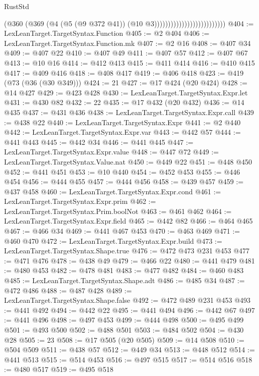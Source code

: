 \begin{lexlean}{RustStd}
\begin{coremodule}
{\begin{coremodule}
{{{{{{{{{{{{{{{{{{{{{{{{{{                                                (@360
                                                  (@369
                                                    (@4
                                                      (@5 (@9 @372 @41))
                                                      (@10 @3))))))))))))))))))))))))))
@404 := LexLeanTarget.TargetSyntax.Function
@405 := @2 @404
@406 := LexLeanTarget.TargetSyntax.Function.mk
@407 := @2 @16
@408 := @407 @34
@409 := @407 @22
@410 := @407 @49
@411 := @407 @57
@412 := @407 @67
@413 := @10 @16
@414 := @412 @413
@415 := @411 @414
@416 := @410 @415
@417 := @409 @416
@418 := @408 @417
@419 := @406 @418
@423 := @419 (@73 (@36 (@30 @349)))
@424 := 21
@427 := @17 @424 (@20 @424)
@428 := @14 @427
@429 := @423 @428
@430 := LexLeanTarget.TargetSyntax.Expr.let
@431 := @430 @82
@432 := 22
@435 := @17 @432 (@20 @432)
@436 := @14 @435
@437 := @431 @436
@438 := LexLeanTarget.TargetSyntax.Expr.call
@439 := @438 @22
@440 := LexLeanTarget.TargetSyntax.Expr
@441 := @2 @440
@442 := LexLeanTarget.TargetSyntax.Expr.var
@443 := @442 @57
@444 := @441 @443
@445 := @442 @34
@446 := @441 @445
@447 := LexLeanTarget.TargetSyntax.Expr.value
@448 := @447 @72
@449 := LexLeanTarget.TargetSyntax.Value.nat
@450 := @449 @22
@451 := @448 @450
@452 := @441 @451
@453 := @10 @440
@454 := @452 @453
@455 := @446 @454
@456 := @444 @455
@457 := @444 @456
@458 := @439 @457
@459 := @437 @458
@460 := LexLeanTarget.TargetSyntax.Expr.cond
@461 := LexLeanTarget.TargetSyntax.Expr.prim
@462 := LexLeanTarget.TargetSyntax.Prim.boolNot
@463 := @461 @462
@464 := LexLeanTarget.TargetSyntax.Expr.field
@465 := @442 @82
@466 := @464 @465
@467 := @466 @34
@469 := @441 @467 @453
@470 := @463 @469
@471 := @460 @470
@472 := LexLeanTarget.TargetSyntax.Expr.build
@473 := LexLeanTarget.TargetSyntax.Shape.true
@476 := @472 @473 @231 @453
@477 := @471 @476
@478 := @438 @49
@479 := @466 @22
@480 := @441 @479
@481 := @480 @453
@482 := @478 @481
@483 := @477 @482
@484 := @460 @483
@485 := LexLeanTarget.TargetSyntax.Shape.adt
@486 := @485 @34
@487 := @472 @486
@488 := @487 @428
@489 := LexLeanTarget.TargetSyntax.Shape.false
@492 := @472 @489 @231 @453
@493 := @441 @492
@494 := @442 @22
@495 := @441 @494
@496 := @442 @67
@497 := @441 @496
@498 := @497 @453
@499 := @444 @498
@500 := @495 @499
@501 := @493 @500
@502 := @488 @501
@503 := @484 @502
@504 := @430 @28
@505 := 23
@508 := @17 @505 (@20 @505)
@509 := @14 @508
@510 := @504 @509
@511 := @438 @57
@512 := @449 @34
@513 := @448 @512
@514 := @441 @513
@515 := @514 @453
@516 := @497 @515
@517 := @514 @516
@518 := @480 @517
@519 := @495 @518
}}}}}}}}}}}}}}}}}}}}}}}}}}
\end{coremodule}}
\end{coremodule}
\end{lexlean}
